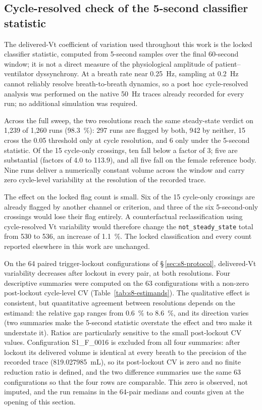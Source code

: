 \documentclass[pdflatex,sn-nature]{sn-jnl}%
\begin{document}
\subsection{Cycle-resolved check of the 5-second classifier statistic}\label{sec:s8-cycle}

The delivered-Vt coefficient of variation used throughout this work is the locked classifier statistic, computed from 5-second samples over the final 60-second window; it is not a direct measure of the physiological amplitude of patient--ventilator dyssynchrony. At a breath rate near 0.25~Hz, sampling at 0.2~Hz cannot reliably resolve breath-to-breath dynamics, so a post hoc cycle-resolved analysis was performed on the native 50~Hz traces already recorded for every run; no additional simulation was required.

Across the full sweep, the two resolutions reach the same steady-state verdict on 1{,}239 of 1{,}260 runs (98.3~\%): 297 runs are flagged by both, 942 by neither, 15 cross the 0.05 threshold only at cycle resolution, and 6 only under the 5-second statistic. Of the 15 cycle-only crossings, ten fall below a factor of 3; five are substantial (factors of 4.0 to 113.9), and all five fall on the female reference body. Nine runs deliver a numerically constant volume across the window and carry zero cycle-level variability at the resolution of the recorded trace.

The effect on the locked flag count is small. Six of the 15 cycle-only crossings are already flagged by another channel or criterion, and three of the six 5-second-only crossings would lose their flag entirely. A counterfactual reclassification using cycle-resolved Vt variability would therefore change the \texttt{not\_steady\_state} total from 530 to 536, an increase of 1.1~\%. The locked classification and every count reported elsewhere in this work are unchanged.

On the 64 paired trigger-lockout configurations of \S\,\ref{sec:s8-protocol}, delivered-Vt variability decreases after lockout in every pair, at both resolutions. Four descriptive summaries were computed on the 63 configurations with a non-zero post-lockout cycle-level CV (Table~\ref{tab:s8-estimands}). The qualitative effect is consistent, but quantitative agreement between resolutions depends on the estimand: the relative gap ranges from 0.6~\% to 8.6~\%, and its direction varies (two summaries make the 5-second statistic overstate the effect and two make it understate it). Ratios are particularly sensitive to the small post-lockout CV values. Configuration S1\_F\_0016 is excluded from all four summaries: after lockout its delivered volume is identical at every breath to the precision of the recorded trace (819.027985~mL), so its post-lockout CV is zero and no finite reduction ratio is defined, and the two difference summaries use the same 63 configurations so that the four rows are comparable. This zero is observed, not imputed, and the run remains in the 64-pair medians and counts given at the opening of this section.
\end{document}
